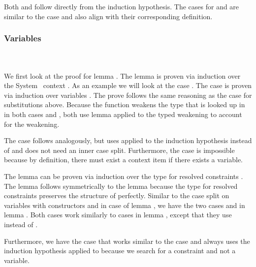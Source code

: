 \noindent Both  and  follow directly from the induction hypothesis. 
The cases for  and  are similar to the case  and also align with their corresponding definition.

\subsubsection{Variables}\hfill\\\\
We first look at the proof for lemma . 
The lemma is proven via induction over the System \Fo\ context . 
\DPTVarPresLookup
As an example we will look at the case   . The case is proven via induction over variables . 
The prove follows the same reasoning as the  case for substitutions above. 
Because the function  weakens the type  that is looked up in  in both cases  and , both use lemma  applied to the typed weakening  to account for the weakening. 

\noindent The case    follows analogously, but uses  applied to the induction hypothesis instead of  and does not need an inner case split. Furthermore, the case  is impossible because by definition, there must exist a context item if there exists a variable.

\noindent The lemma  can be proven via induction over the type for resolved constraints \Data{[}  \Data{]∈} . The lemma follows symmetrically to the lemma  because the type for resolved constraints preserves the structure of  perfectly.
\newpage
\DPTOVarPresLookup
Similar to the case split on variables with constructors  and  in case    of lemma , we have the two cases  and  in lemma . Both cases work similarly to cases in lemma , except that they use  instead of .

\noindent Furthermore, we have the case  that works similar to the case    and always uses the induction hypothesis applied to  because we search for a constraint and not a variable.